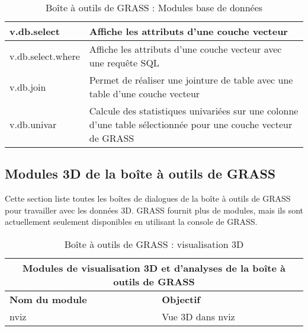 \begin{table}[H]
\begin{tabular}{|p{4cm}|p{10cm}|}
  \hline v.db.select & Affiche les attributs d'une couche vecteur\\
  \hline v.db.select.where & Affiche les attributs d'une couche vecteur avec une requ\^ete SQL\\
  \hline v.db.join & Permet de réaliser une jointure de table avec une table d'une couche vecteur\\
  \hline v.db.univar & Calcule des statistiques univariées sur une colonne d'une table sélectionnée pour une couche vecteur de GRASS\\
\hline
\end{tabular}
\caption{Boîte à outils de GRASS : Modules base de données}
\end{table}

\newpage

\subsection{Modules 3D de la boîte à outils de GRASS}

Cette section liste toutes les boîtes de dialogues de la boîte à outils de GRASS pour travailler avec les données 3D. GRASS fournit plus de modules, mais ils sont actuellement seulement disponibles en utilisant la console de GRASS.

\begin{table}[H]
\centering
 \begin{tabular}{|p{4cm}|p{10cm}|}
  \hline \multicolumn{2}{|c|}{\textbf{Modules de visualisation 3D et d'analyses de la boîte à outils de GRASS}} \\
  \hline \textbf{Nom du module} & \textbf{Objectif} \\
  \hline nviz & Vue 3D dans nviz\\
\hline
\end{tabular}
\caption{Boîte à outils de GRASS : visualisation 3D}
\end{table}

